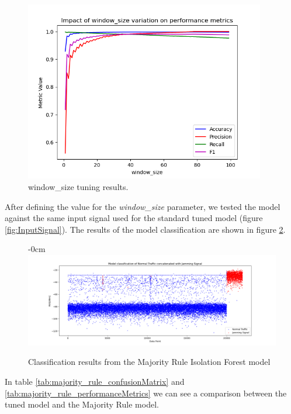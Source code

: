 \documentclass[futureinternet,article,submit,pdftex,moreauthors]{Definitions/mdpi}
\begin{document}
\begin{figure}[H]
	\includegraphics[width=10.5cm]{img/WindowSizeTuning.png}
	\caption{window\_size tuning results.}\label{fig:window_size_tuning}
\end{figure}

After defining the value for the \textit{window\_size} parameter, we tested the model against the same input signal used for the standard tuned model (figure \ref{fig:InputSignal}). The results of the model classification are shown in figure \ref{fig:majorityRuleIsolationResults}. 

\begin{figure}[H]
	\begin{adjustwidth}{-\extralength}{0cm}
	\centering
	\includegraphics[width=19.5cm]{img/MajorityRuleIsolatioForestClassification.png}
	\caption{Classification results from the Majority Rule Isolation Forest model}\label{fig:majorityRuleIsolationResults}
	\end{adjustwidth}
\end{figure}

In table \ref{tab:majority_rule_confusionMatrix} and \ref{tab:majority_rule_performanceMetrics} we can see a comparison between the tuned model and the Majority Rule model.
\end{document}
